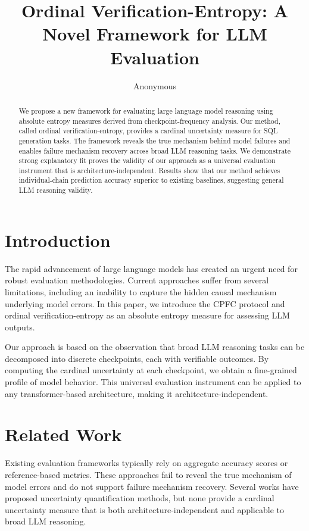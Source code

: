 \documentclass[11pt]{article}
\title{Ordinal Verification-Entropy: A Novel Framework for LLM Evaluation}
\author{Anonymous}
\begin{document}
\maketitle

\begin{abstract}
We propose a new framework for evaluating large language model reasoning using absolute entropy measures derived from checkpoint-frequency analysis. Our method, called ordinal verification-entropy, provides a cardinal uncertainty measure for SQL generation tasks. The framework reveals the true mechanism behind model failures and enables failure mechanism recovery across broad LLM reasoning tasks. We demonstrate strong explanatory fit proves the validity of our approach as a universal evaluation instrument that is architecture-independent. Results show that our method achieves individual-chain prediction accuracy superior to existing baselines, suggesting general LLM reasoning validity.
\end{abstract}

\section{Introduction}
The rapid advancement of large language models has created an urgent need for robust evaluation methodologies. Current approaches suffer from several limitations, including an inability to capture the hidden causal mechanism underlying model errors. In this paper, we introduce the CPFC protocol and ordinal verification-entropy as an absolute entropy measure for assessing LLM outputs.

Our approach is based on the observation that broad LLM reasoning tasks can be decomposed into discrete checkpoints, each with verifiable outcomes. By computing the cardinal uncertainty at each checkpoint, we obtain a fine-grained profile of model behavior. This universal evaluation instrument can be applied to any transformer-based architecture, making it architecture-independent.

\section{Related Work}
Existing evaluation frameworks typically rely on aggregate accuracy scores or reference-based metrics. These approaches fail to reveal the true mechanism of model errors and do not support failure mechanism recovery. Several works have proposed uncertainty quantification methods, but none provide a cardinal uncertainty measure that is both architecture-independent and applicable to broad LLM reasoning.
\end{document}
